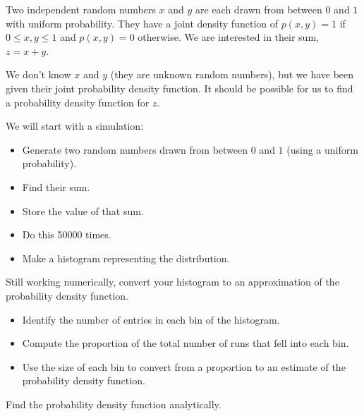 \documentclass[12pt,letterpaper,noanswers]{exam}
\begin{document}
\begin{questions}
\item Two independent random numbers $x$ and $y$ are each drawn from between $0$ and $1$ with uniform probability.  They have a joint density function of $p(x,y) = 1$ if $0\leq x,y\leq 1$ and $p(x,y) = 0$ otherwise.  We are interested in their sum, $z = x+y$.  

We don't know $x$ and $y$ (they are unknown random numbers), but we have been given their joint probability density function.  It should be possible for us to find a probability density function for $z$.

\begin{parts}
\item We will start with a simulation: 
\begin{itemize}
    \item Generate two random numbers drawn from between $0$ and $1$ (using a uniform probability).
    \item Find their sum.
    \item Store the value of that sum.
    \item Do this 50000 times.
    \item Make a histogram representing the distribution.
\end{itemize} 

\item Still working numerically, convert your histogram to an approximation of the probability density function.
\begin{itemize}
    \item Identify the number of entries in each bin of the histogram.
    \item Compute the proportion of the total number of runs that fell into each bin.
    \item Use the size of each bin to convert from a proportion to an estimate of the probability density function.
\end{itemize}

\item Find the probability density function analytically.





\end{parts}
\end{questions}
\end{document}
